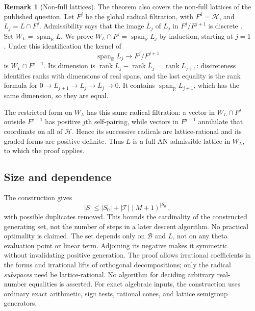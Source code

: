 \documentclass[11pt,letterpaper]{article}
\theoremstyle{definition}
\newtheorem{remark}[remark]{Remark}
\newcommand{\R}{\mathbb R}
\newcommand{\spanR}{\operatorname{span}_{\R}}
\newcommand{\cB}{\mathcal B}
\newcommand{\cH}{\mathcal H}
\newcommand{\cT}{\mathcal T}
\begin{document}
\begin{remark}[Non-full lattices]\label{tate:theta:rem:nonfull}
The theorem also covers the non-full lattices of the published question.
Let $F^j$ be the global radical filtration, with $F^1=\cH$, and
$L_j=L\cap F^j$. Admissibility says that the image
$\overline L_j$ of $L_j$ in $F^j/F^{j+1}$ is discrete
\cite[Theorem~8.1]{AN}. Set $W_L=\spanR L$.
We prove $W_L\cap F^j=\spanR L_j$ by induction, starting at $j=1$.
Under this identification the kernel of
\[
 \spanR L_j\longrightarrow F^j/F^{j+1}
\]
is $W_L\cap F^{j+1}$. Its dimension is
$\operatorname{rank}L_j-\operatorname{rank}\overline L_j
=\operatorname{rank}L_{j+1}$: discreteness identifies ranks with
dimensions of real spans, and the last equality is the rank formula
for $0\to L_{j+1}\to L_j\to\overline L_j\to0$.
It contains $\spanR L_{j+1}$, which has the same dimension, so they
are equal.

The restricted form on $W_L$ has this same radical filtration:
a vector in $W_L\cap F^j$ outside $F^{j+1}$ has positive $j$th
self-pairing, while vectors in $F^{j+1}$ annihilate that coordinate
on all of $\cH$. Hence its successive radicals are lattice-rational
and its graded forms are positive definite. Thus $L$ is a full
AN-admissible lattice in $W_L$, to which the proof applies.
\end{remark}

\subsection{Size and dependence}

The construction gives
\begin{equation}
 |S|\le|S_0|+|\cT|(M+1)^{|S_0|},\label{tate:theta:eq:Sbound}
\end{equation}
with possible duplicates removed. This bounds the cardinality of the
constructed generating set, not the number of steps in a later descent
algorithm. No practical optimality is claimed. The set depends only on $\cB$
and $L$, not on any theta evaluation point or linear term. Adjoining its
negative makes it symmetric without invalidating positive generation. The
proof allows irrational coefficients in the forms and irrational lifts of
orthogonal decompositions; only the radical \emph{subspaces} need be
lattice-rational. No algorithm for deciding arbitrary real-number
equalities is asserted. For exact algebraic inputs, the construction uses
ordinary exact arithmetic, sign tests, rational cones, and lattice
semigroup generators.
\end{document}
